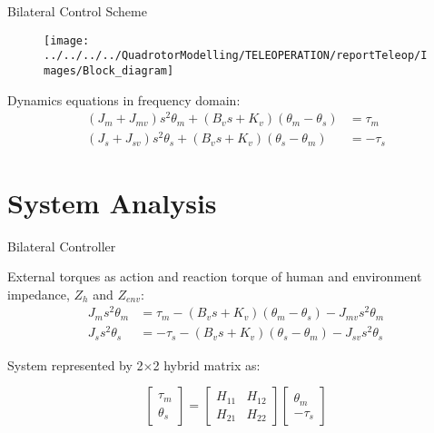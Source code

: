 \documentclass[10pt]{beamer}
\begin{document}
\begin{frame}{Bilateral Control Scheme}

	\begin{figure}
	\centering
	\texttt{[image: ../../../../QuadrotorModelling/TELEOPERATION/reportTeleop/Images/Block\_diagram]}
	\end{figure}

Dynamics equations in frequency domain:
\begin{align*}
	(J_m + J_{mv}) s^2 \theta_m + (B_v s + K_v) (\theta_m - \theta_s) &= \tau_m \\
	(J_s + J_{sv}) s^2 \theta_s + (B_v s + K_v) (\theta_s - \theta_m) &= -\tau_s 
\end{align*}
	
\end{frame}

\section{System Analysis}

\begin{frame}[fragile]{Bilateral Controller}

External torques as action and reaction torque of human and environment impedance, $ Z_{h} $ and $ Z_{env} $:
\begin{align*}
	J_m s^2 \theta_m &= \tau_m - (B_v s + K_v) (\theta_m - \theta_s) - J_{mv} s^2 \theta_m \\
	J_s s^2 \theta_s &= - \tau_s - (B_v s + K_v) (\theta_s - \theta_m) - J_{sv} s^2 \theta_s
\end{align*}

System represented by 2$\times $2 hybrid matrix as:

\begin{equation*}
\begin{bmatrix}
\tau_m \\ \theta_s
\end{bmatrix} = 
\begin{bmatrix}
H_{11} & H_{12} \\
H_{21} & H_{22}
\end{bmatrix}
\begin{bmatrix}
\theta_m \\ - \tau_s
\end{bmatrix}
\label{hybrid_matrix}
\end{equation*}

\end{frame}
\end{document}
